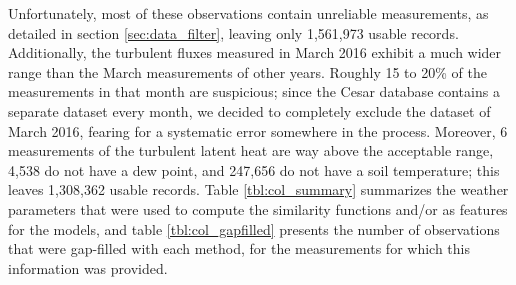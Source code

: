 \documentclass[a4paper]{book}
\begin{document}
Unfortunately, most of these observations contain unreliable measurements, as detailed in section \ref{sec:data_filter}, leaving only  1,561,973 usable records. Additionally, the turbulent fluxes measured in March 2016 exhibit a much wider range than the March measurements of other years. Roughly 15 to 20\% of the measurements in that month are suspicious; since the Cesar database contains a separate dataset every month, we decided to completely exclude the dataset of March 2016, fearing for a systematic error somewhere in the process. Moreover, 6 measurements of the turbulent latent heat are way above the acceptable range, 4,538 do not have a dew point, and 247,656 do not have a soil temperature; this leaves 1,308,362 usable records. Table \ref{tbl:col_summary} summarizes the weather parameters that were used to compute the similarity functions and/or as features for the models, and table \ref{tbl:col_gapfilled} presents the number of observations that were gap-filled with each method, for the measurements for which this information was provided.
\end{document}
